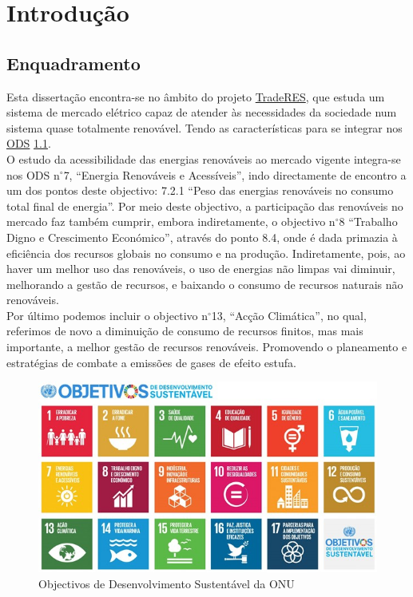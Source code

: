 \chapter{Introdução}

\section{Enquadramento\label{se:enquadramento}}
Esta dissertação encontra-se no âmbito do projeto \href{https://traderes.eu/}{TradeRES}, que estuda um sistema de mercado elétrico capaz de atender às necessidades da sociedade num sistema quase totalmente renovável. Tendo as características para se integrar nos \href{https://ods.pt/ods/}{ \gls{ODS}} \ref{fig:ODS}. \\
O estudo da acessibilidade das energias renováveis ao mercado vigente integra-se nos \gls{ODS} n$^{\circ}$7, “Energia Renováveis e Acessíveis”, indo directamente de encontro a um dos pontos deste objectivo: 7.2.1 “Peso das energias renováveis no consumo total final de energia”. Por meio deste objectivo, a participação das renováveis no mercado faz também cumprir, embora indiretamente, o objectivo n$^{\circ}$8 “Trabalho Digno e Crescimento Económico”, através do ponto 8.4, onde é dada primazia à eficiência dos recursos globais no consumo e na produção. Indiretamente, pois, ao haver um melhor uso das renováveis, o uso de energias não limpas vai diminuir, melhorando a gestão de recursos, e baixando o consumo de recursos naturais não renováveis. \\
Por último podemos incluir o objectivo n$^{\circ}$13, “Acção Climática”, no qual, referimos de novo a diminuição de consumo de recursos finitos, mas mais importante, a melhor gestão de recursos renováveis. Promovendo o planeamento e estratégias de combate a emissões de gases de efeito estufa. \\

\begin{figure}[h]
    \centering
    \includegraphics{Imagens/DesenvolvimentoSustentavel.jpg}
    \caption{Objectivos de Desenvolvimento Sustentável da ONU}
    \label{fig:ODS}
\end{figure}

